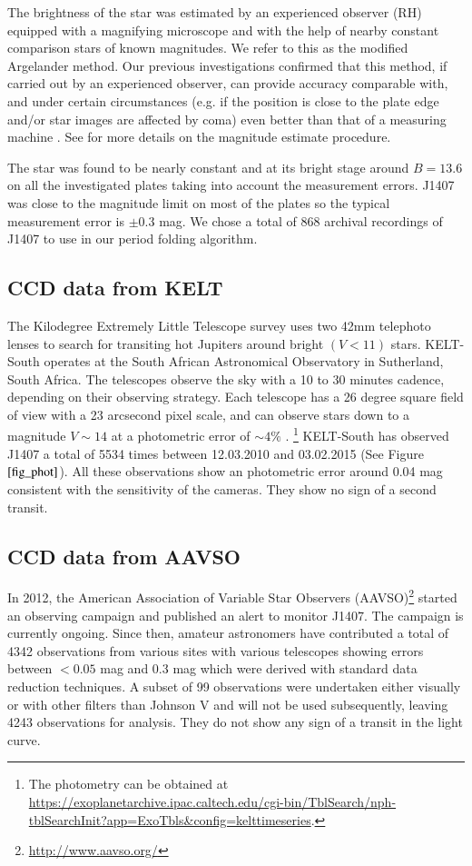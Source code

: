 \documentclass[twocolumn]{aa}
\begin{document}
The brightness of the star was estimated by an experienced observer (RH) equipped with a magnifying microscope and with the help of nearby constant comparison stars of known magnitudes.
%
We refer to this as the modified Argelander method.
%
Our previous investigations confirmed that this method, if carried out by an experienced observer, can provide accuracy comparable with, and under certain circumstances (e.g. if the position is close to the plate edge and/or star images are affected by coma) even better than that of a measuring machine \citep{Hudec76}.
%
See \citet{Hudec13} for more details on the magnitude estimate procedure.

The star was found to be nearly constant and at its bright stage around $B=13.6$ on all the investigated plates taking into account the measurement errors.
%
J1407 was close to the magnitude limit on most of the plates so the typical measurement error is $\pm 0.3$ mag. 
%
We chose a total of 868 archival recordings of J1407 to use in our period folding algorithm.

\subsection{CCD data from KELT}
The Kilodegree Extremely Little Telescope \citep[KELT;][]{Pepper07,Pepper12} survey uses two 42mm telephoto lenses to search for transiting hot Jupiters around bright $(V<11)$ stars.
%
KELT-South operates at the South African Astronomical Observatory in Sutherland, South Africa.
%
The telescopes observe the sky with a 10 to 30 minutes cadence, depending on their observing strategy.
%
Each telescope has a 26 degree square field of view with a 23 arcsecond pixel scale, and can observe stars down to a magnitude $V\sim 14$ at a photometric error of $\sim 4\%$ \citep{Pepper07,Pepper12}.
%
\footnote{The photometry can be obtained at \url{https://exoplanetarchive.ipac.caltech.edu/cgi-bin/TblSearch/nph-tblSearchInit?app=ExoTbls&config=kelttimeseries}.}
%
KELT-South has observed J1407 a total of 5534 times between 12.03.2010 and 03.02.2015 (See Figure~$\ref{fig_phot}$).
%
All these observations show an photometric error around 0.04 mag consistent with the sensitivity of the cameras.
%
They show no sign of a second transit.

\subsection{CCD data from AAVSO}
In 2012, the American Association of Variable Star Observers (AAVSO)\footnote{\url{http://www.aavso.org/}} started an observing campaign and published an alert to monitor J1407.
%
The campaign is currently ongoing.
%
Since then, amateur astronomers have contributed a total of 4342 observations from various sites with various telescopes showing errors between $<0.05$ mag and 0.3 mag which were derived with standard data reduction techniques.
%
A subset of 99 observations were undertaken either visually or with other filters than Johnson V and will not be used subsequently, leaving 4243 observations for analysis.
%
They do not show any sign of a transit in the light curve.
\end{document}
